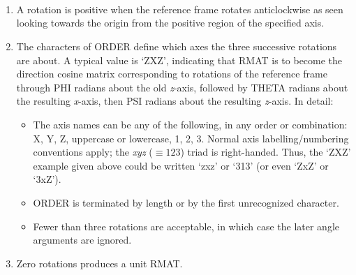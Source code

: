 {
}
{
  \\
  \\
  \\
}
{
}
\notes
{
 \begin{enumerate}
  \item A rotation is positive when the reference frame rotates
        anticlockwise as seen looking towards the origin from the
        positive region of the specified axis.
  \item The characters of ORDER define which axes the three successive
        rotations are about.  A typical value is `ZXZ', indicating that
        RMAT is to become the direction cosine matrix corresponding to
        rotations of the reference frame through PHI radians about the
        old {\it z}-axis, followed by THETA radians about the resulting
        {\it x}-axis,
        then PSI radians about the resulting {\it z}-axis.  In detail:
        \begin{itemize}
         \item The axis names can be any of the following, in any order or
               combination:  X, Y, Z, uppercase or lowercase, 1, 2, 3.  Normal
               axis labelling/numbering conventions apply;
               the {\it xyz} ($\equiv123$)
               triad is right-handed.  Thus, the `ZXZ' example given above
               could be written `zxz' or `313' (or even `ZxZ' or `3xZ').
         \item ORDER is terminated by length or by the first unrecognized
               character.
         \item Fewer than three rotations are acceptable, in which case
               the later angle arguments are ignored.
        \end{itemize}
  \item Zero rotations produces a unit RMAT.
 \end{enumerate}
}
